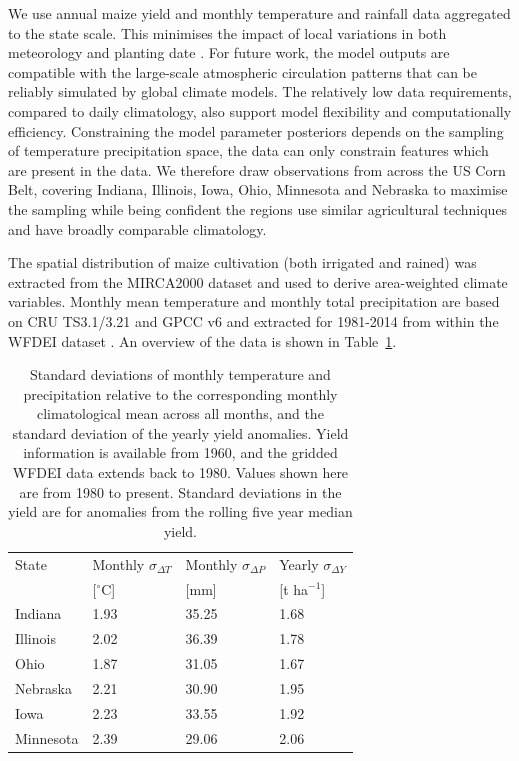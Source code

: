 \documentclass[12pt]{iopart}
\begin{document}
We use annual maize yield and monthly temperature and rainfall data aggregated to the state scale. This minimises the impact of local variations in both meteorology and planting date \citep[e.g.][]{schlenker:2009, lobell:2010}. For future work, the model outputs are compatible with the large-scale atmospheric circulation patterns that can be reliably simulated by global climate models. The relatively low data requirements, compared to daily climatology, also support model flexibility and computationally efficiency. Constraining the model parameter posteriors depends on the sampling of temperature precipitation space, the data can only constrain features which are present in the data. We therefore draw observations from across the US Corn Belt, covering Indiana, Illinois, Iowa, Ohio, Minnesota and Nebraska to maximise the sampling while being confident the regions use similar agricultural techniques and have broadly comparable climatology.

The spatial distribution of maize cultivation (both irrigated and rained) was extracted from the MIRCA2000 dataset \citep{Portmann:2010} and used to derive area-weighted climate variables. Monthly mean temperature and monthly total precipitation are based on CRU TS3.1/3.21 \citep{Harris:2014} and GPCC v6 \citep{Schneider:2014} and extracted for 1981-2014 from within the WFDEI dataset \citep{Weedon:2014}. An overview of the data is shown in Table~\ref{table:data}. 

\begin{table}
\centering
\caption{
Standard deviations of monthly temperature and precipitation relative to the corresponding monthly climatological mean across all months, and the standard deviation of the yearly yield anomalies. Yield information is available from 1960, and the gridded WFDEI data extends back to 1980. Values shown here are from 1980 to present. Standard deviations in the yield are for anomalies from the rolling five year median yield.}


\label{table:data}
\vskip 0.15in
\begin{tabular}{llll}
State  & 
Monthly $\sigma_{\Delta T}$   & 
Monthly $\sigma_{\Delta P}$   & 
Yearly $\sigma_{\Delta Y}$   \\

& [$^\circ$C] & [mm] & [t ha$^{-1}$]\\
\hline
Indiana & 1.93 & 35.25 & 1.68 \\ 
Illinois & 2.02 & 36.39 & 1.78 \\ 
Ohio & 1.87 & 31.05 & 1.67 \\ 
Nebraska & 2.21 & 30.90 & 1.95 \\ 
Iowa & 2.23 & 33.55 & 1.92 \\ 
Minnesota & 2.39 & 29.06 & 2.06 \\ 
\end{tabular}
\end{table}
\end{document}
